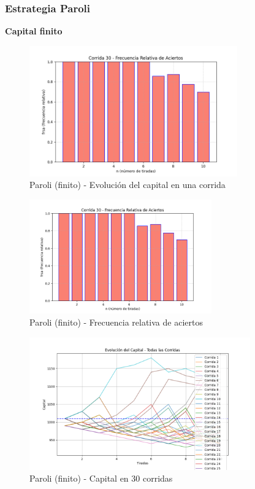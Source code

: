 \documentclass{article}
\begin{document}
\vspace{0.5cm}

\subsubsection*{Estrategia Paroli}

\textbf{Capital finito}

\begin{figure}
    \centering
    \includegraphics[width=0.8\textwidth]{./images/frsa_corrida_30_p_f.png}
    \caption{Paroli (finito) - Evolución del capital en una corrida}
\end{figure}

\begin{figure}
    \centering
    \includegraphics[width=0.7\textwidth]{./images/frsa_corrida_30_p_f.png}
    \caption{Paroli (finito) - Frecuencia relativa de aciertos}
\end{figure}

\begin{figure}
    \centering
    \includegraphics[width=0.85\textwidth]{./images/capital_todas_corridas_p_f.png}
    \caption{Paroli (finito) - Capital en 30 corridas}
\end{figure}
\end{document}
